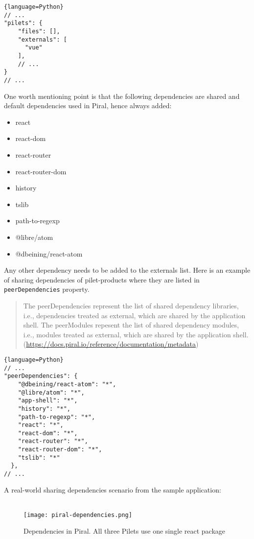 \documentclass[a4paper]{book}
\begin{document}
\begin{lstlisting}{language=Python}
// ...
"pilets": {
    "files": [],
    "externals": [
      "vue"
    ],
    // ...
}
// ...
\end{lstlisting}
One worth mentioning point is that the following dependencies are shared and default dependencies used in Piral, hence always added:
\begin{itemize}
    \item react
    \item react-dom
    \item react-router
    \item react-router-dom
    \item history
    \item tslib
    \item path-to-regexp
    \item @libre/atom
    \item @dbeining/react-atom
    
\end{itemize}
Any other dependency needs to be added to the externals list.
Here is an example of sharing dependencies of pilet-products where they are listed in \verb|peerDependencies| property.
\begin{quote}
The peerDependencies represent the list of shared dependency libraries, i.e., dependencies treated as external, which are shared by the application shell. The peerModules repesent the list of shared dependency modules, i.e., modules treated as external, which are shared by the application shell. (\url{https://docs.piral.io/reference/documentation/metadata})

\end{quote}
\begin{lstlisting}{language=Python}
// ...
"peerDependencies": {
    "@dbeining/react-atom": "*",
    "@libre/atom": "*",
    "app-shell": "*",
    "history": "*",
    "path-to-regexp": "*",
    "react": "*",
    "react-dom": "*",
    "react-router": "*",
    "react-router-dom": "*",
    "tslib": "*"
  },
// ...
\end{lstlisting}

A real-world sharing dependencies scenario from the sample application:
\\ \\
\begin{figure}[h!]
    \centering
    \captionsetup{justification=centering}
    \texttt{[image: piral-dependencies.png]}
    \caption{Dependencies in Piral. All three Pilets use one single react package}
    \label{fig:piral-dependencies}
\end{figure}
\end{document}
